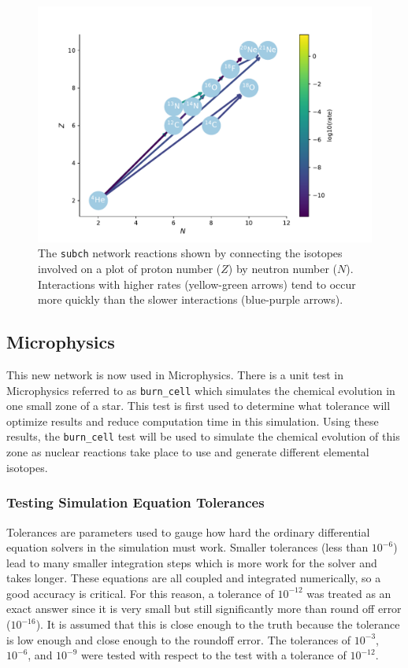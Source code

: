 \documentclass[preprint]{aastex62}
\begin{document}
    \begin{figure}
      \centering
      \includegraphics[width=5in]{images/subch}
      \caption{The {\tt subch} network reactions shown by connecting the isotopes involved on a plot of proton number ($Z$) by neutron number ($N$). Interactions with higher rates (yellow-green arrows) tend to occur more quickly than the slower interactions (blue-purple arrows).}
      \label{fig:network}
    \end{figure}
  
  \subsection{Microphysics}
  
    This new network is now used in Microphysics. There is a unit test in Microphysics referred to as {\tt burn\_cell} which simulates the chemical evolution in one small zone of a star. This test is first used to determine what tolerance will optimize results and reduce computation time in this simulation. Using these results, the {\tt burn\_cell} test will be used to simulate the chemical evolution of this zone as nuclear reactions take place to use and generate different elemental isotopes. 
  
    \subsubsection{Testing Simulation Equation Tolerances}
  
      Tolerances are parameters used to gauge how hard the ordinary differential equation solvers in the simulation must work. Smaller tolerances (less than $10^{-6}$) lead to many smaller integration steps which is more work for the solver and takes longer. These equations are all coupled and integrated numerically, so a good accuracy is critical. For this reason, a tolerance of $10^{-12}$ was treated as an exact answer since it is very small but still significantly more than round off error ($10^{-16}$). It is assumed that this is close enough to the truth because the tolerance is low enough and close enough to the roundoff error. The tolerances of $10^{-3}$, $10^{-6}$, and $10^{-9}$ were tested with respect to the test with a tolerance of $10^{-12}$. 
     
\end{document}

